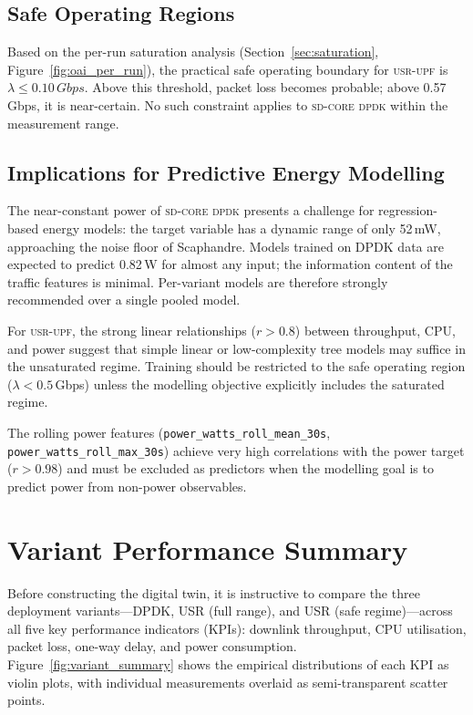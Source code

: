 \documentclass[12pt, a4paper]{report}
\newcommand{\dpdk}{\textsc{sd-core dpdk}}
\newcommand{\usr}{\textsc{usr-upf}}
\begin{document}
\subsection{Safe Operating Regions}

Based on the per-run saturation analysis
(Section~\ref{sec:saturation}, Figure~\ref{fig:oai_per_run}),
the practical safe operating boundary for \usr{} is
$\lambda \leq 0.10\,Gbps$.
Above this threshold, packet loss becomes probable; above
0.57\,Gbps, it is near-certain.
No such constraint applies to \dpdk{} within the measurement range.

\subsection{Implications for Predictive Energy Modelling}

The near-constant power of \dpdk{} presents a challenge for regression-based
energy models: the target variable has a dynamic range of only 52\,mW,
approaching the noise floor of Scaphandre.
Models trained on DPDK data are expected to predict 0.82\,W for
almost any input; the information content of the traffic features is minimal.
Per-variant models are therefore strongly recommended over a single pooled model.

For \usr{}, the strong linear relationships ($r > 0.8$) between
throughput, CPU, and power suggest that simple linear or low-complexity
tree models may suffice in the unsaturated regime.
Training should be restricted to the safe operating region
($\lambda < 0.5$\,Gbps) unless the modelling objective explicitly includes
the saturated regime.

The rolling power features (\texttt{power\_watts\_roll\_mean\_30s},
\texttt{power\_watts\_roll\_max\_30s}) achieve very high correlations
with the power target ($r > 0.98$) and must be excluded as predictors
when the modelling goal is to predict power from non-power observables.

\section{Variant Performance Summary}
\label{sec:variant_summary}

Before constructing the digital twin, it is instructive to compare the
three deployment variants---DPDK, USR (full range), and USR (safe
regime)---across all five key performance indicators (KPIs): downlink
throughput, CPU utilisation, packet loss, one-way delay, and power
consumption.
Figure~\ref{fig:variant_summary} shows the empirical distributions of each
KPI as violin plots, with individual measurements overlaid as semi-transparent
scatter points.
\end{document}
